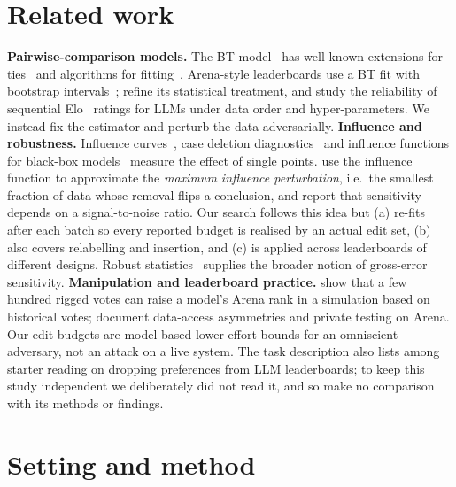 \documentclass{article}
\begin{document}
\section{Related work}
\textbf{Pairwise-comparison models.} The BT model~\citep{bradley1952rank} has well-known extensions for ties~\citep{raokupper1967,davidson1970} and algorithms for fitting~\citep{hunter2004mm}. Arena-style leaderboards use a BT fit with bootstrap intervals~\citep{chiang2024arena}; \citet{ameli2024statistical} refine its statistical treatment, and \citet{boubdir2023elo} study the reliability of sequential Elo~\citep{elo1978} ratings for LLMs under data order and hyper-parameters. We instead fix the estimator and perturb the data adversarially.
\textbf{Influence and robustness.} Influence curves~\citep{hampel1974influence}, case deletion diagnostics~\citep{cook1977detection} and influence functions for black-box models~\citep{koh2017understanding} measure the effect of single points. \citet{broderick2020automatic} use the influence function to approximate the \emph{maximum influence perturbation}, i.e.\ the smallest fraction of data whose removal flips a conclusion, and report that sensitivity depends on a signal-to-noise ratio. Our search follows this idea but (a) re-fits after each batch so every reported budget is realised by an actual edit set, (b) also covers relabelling and insertion, and (c) is applied across leaderboards of different designs. Robust statistics~\citep{huber2009robust} supplies the broader notion of gross-error sensitivity.
\textbf{Manipulation and leaderboard practice.} \citet{min2025rigging} show that a few hundred rigged votes can raise a model's Arena rank in a simulation based on historical votes; \citet{singh2025illusion} document data-access asymmetries and private testing on Arena. Our edit budgets are model-based lower-effort bounds for an omniscient adversary, not an attack on a live system. The task description also lists \citet{huang2025dropping} among starter reading on dropping preferences from LLM leaderboards; to keep this study independent we deliberately did not read it, and so make no comparison with its methods or findings.

\section{Setting and method}\label{sec:method}
\end{document}
